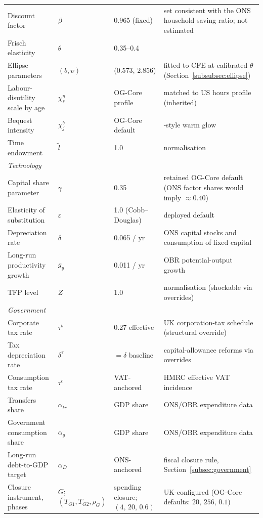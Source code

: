 \begin{table}[t]
{\begin{tabular}{llll}
Discount factor & $\beta$ & 0.965 (fixed) & set consistent with the ONS household saving ratio; not estimated \\
Frisch elasticity & $\theta$ & 0.35--0.4 & \citet{BlundellMaCurdyMeghir2007,Peterman2016} \\
Ellipse parameters & $(b,\upsilon)$ & (0.573, 2.856) & fitted to CFE at calibrated $\theta$ (Section~\ref{subsubsec:ellipse}) \\
Labour-disutility scale by age & $\chi^n_s$ & OG-Core profile & matched to US hours profile (inherited) \\
Bequest intensity & $\chi^b_j$ & OG-Core default & \citet{DeNardi2004}-style warm glow \\
Time endowment & $\tilde{l}$ & 1.0 & normalisation \\
\multicolumn{4}{l}{\emph{Technology}}\\
Capital share parameter & $\gamma$ & 0.35 & retained OG-Core default (ONS factor shares would imply $\approx 0.40$) \\
Elasticity of substitution & $\varepsilon$ & 1.0 (Cobb--Douglas) & deployed default \\
Depreciation rate & $\delta$ & 0.065 / yr & ONS capital stocks and consumption of fixed capital \\
Long-run productivity growth & $g_y$ & 0.011 / yr & OBR potential-output growth \citep{OBR2025EFO} \\
TFP level & $Z$ & 1.0 & normalisation (shockable via overrides) \\
\multicolumn{4}{l}{\emph{Government}}\\
Corporate tax rate & $\tau^b$ & 0.27 effective & UK corporation-tax schedule (structural override) \\
Tax depreciation rate & $\delta^\tau$ & $=\delta$ baseline & capital-allowance reforms via overrides \\
Consumption tax rate & $\tau^c$ & VAT-anchored & HMRC effective VAT incidence \\
Transfers share & $\alpha_{tr}$ & GDP share & ONS/OBR expenditure data \\
Government consumption share & $\alpha_g$ & GDP share & ONS/OBR expenditure data \\
Long-run debt-to-GDP target & $\alpha_D$ & ONS-anchored & fiscal closure rule, Section~\ref{subsec:government} \\
Closure instrument, phases & $G$; $(T_{G1},T_{G2},\rho_G)$ & spending closure; $(4,\,20,\,0.6)$ & UK-configured (OG-Core defaults: $20,\,256,\,0.1$) \\

\end{tabular}}
\end{table}
